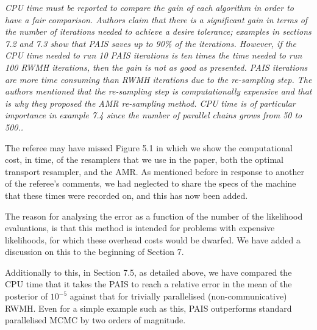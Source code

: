 \documentclass{article}
\newcommand{\comment}[2]{\vspace{0.6cm}{\bf Comment:} {\it #1.}

\vspace{0.3cm}{\bf Answer:} #2}
\begin{document}
\comment{CPU time must be reported to compare the gain of each algorithm in 
order to have a fair comparison. Authors claim that there is a significant 
gain in terms of the number of iterations needed to achieve a desire 
tolerance; examples in sections 7.2 and 7.3 show that PAIS saves up to 90\% of 
the iterations. However, if the CPU time needed to run 10 PAIS iterations is 
ten times the time needed to run 100 RWMH iterations, then the gain is not as 
good as presented. PAIS iterations are more time consuming than RWMH iterations 
due to the re-sampling step. The authors mentioned that the re-sampling step is 
computationally expensive and that is why they proposed the AMR re-sampling 
method. CPU time is of particular importance in example 7.4 since the number of 
parallel chains grows from 50 to 500.}{The referee may have missed Figure 5.1 in which we show the computational cost, in time, of the resamplers that we use in the paper, both the optimal transport resampler, and the AMR. As mentioned before in response to another of the referee's comments, we had neglected to share the specs of the machine that these times were recorded on, and this has now been added. %

The reason for analysing the error as a function of the number of the likelihood evaluations, is that this method is intended for problems with expensive likelihoods, for which these overhead costs would be dwarfed. We have added a discussion on this to the beginning of Section 7.

Additionally to this, in Section 7.5, as detailed above, we have compared the CPU time that it takes the PAIS to reach a relative error in the mean of the posterior of $10^{-5}$ against that for trivially parallelised (non-communicative) RWMH. Even for a simple example such as this, PAIS outperforms standard parallelised MCMC by two orders of magnitude.}%
\end{document}
